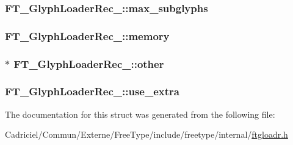 \hypertarget{struct_f_t___glyph_loader_rec___a2d5b00d7caf624ed2b4f6fd2db3228db}{
\subsubsection[{max\-\_\-subglyphs}]{ F\-T\-\_\-\-Glyph\-Loader\-Rec\-\_\-\-::max\-\_\-subglyphs}}\label{struct_f_t___glyph_loader_rec___a2d5b00d7caf624ed2b4f6fd2db3228db}
\hypertarget{struct_f_t___glyph_loader_rec___a9120a7808ee59d24dd52409e609907a2}{
\subsubsection[{memory}]{ F\-T\-\_\-\-Glyph\-Loader\-Rec\-\_\-\-::memory}}\label{struct_f_t___glyph_loader_rec___a9120a7808ee59d24dd52409e609907a2}
\hypertarget{struct_f_t___glyph_loader_rec___a9c58c5b06f0135fe5cef16bd85d939e3}{
\subsubsection[{other}]{$\ast$ F\-T\-\_\-\-Glyph\-Loader\-Rec\-\_\-\-::other}}\label{struct_f_t___glyph_loader_rec___a9c58c5b06f0135fe5cef16bd85d939e3}
\hypertarget{struct_f_t___glyph_loader_rec___a54009985acda32d83f2f124e28c5d00a}{
\subsubsection[{use\-\_\-extra}]{ F\-T\-\_\-\-Glyph\-Loader\-Rec\-\_\-\-::use\-\_\-extra}}\label{struct_f_t___glyph_loader_rec___a54009985acda32d83f2f124e28c5d00a}


The documentation for this struct was generated from the following file\-:\begin{DoxyCompactItemize}
\item 
Cadriciel/\-Commun/\-Externe/\-Free\-Type/include/freetype/internal/\hyperlink{ftgloadr_8h}{ftgloadr.\-h}\end{DoxyCompactItemize}
